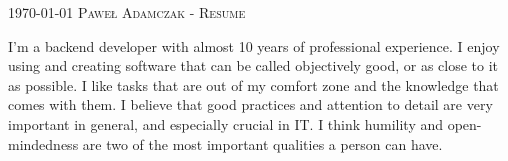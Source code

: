 \documentclass[localFont,alternative,10pt]{yaac-another-awesome-cv}
\begin{document}
  \makecvheader

  \makecvfooter
    {\textsc{\today}}
    {\textsc{Paweł Adamczak - Resume}}
    {\thepage}

  \par{
    I'm a backend developer with almost 10 years of professional experience. I
    enjoy using and creating software that can be called objectively good, or as
    close to it as possible. I like tasks that are out of my comfort zone and the
    knowledge that comes with them. I believe that good practices and attention to
    detail are very important in general, and especially crucial in IT. I think
    humility and open-mindedness are two of the most important qualities a person
    can have.
  }

  \vspace{1em}


  \begin{keywords}
  \end{keywords}

\end{document}
